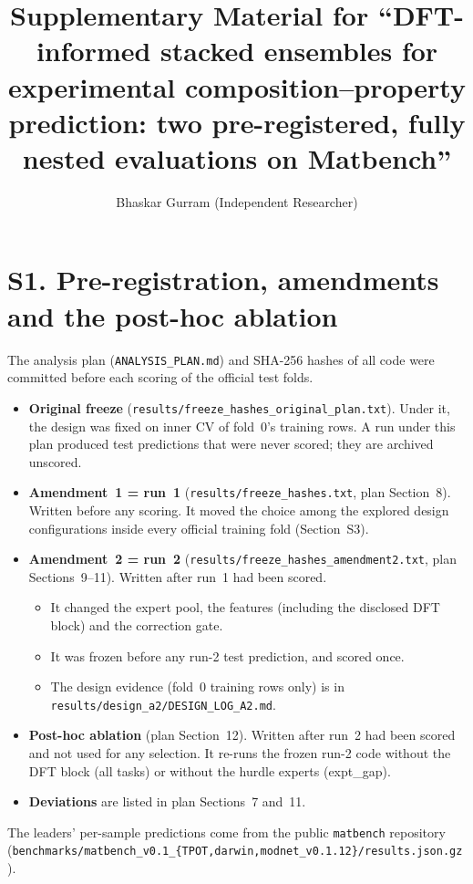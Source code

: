 \documentclass[11pt]{article}
\title{Supplementary Material for ``DFT-informed stacked ensembles for experimental composition--property prediction: two pre-registered, fully nested evaluations on Matbench''}
\author{Bhaskar Gurram (Independent Researcher)}
\date{}
\begin{document}
\maketitle
\tableofcontents

\section*{S1. Pre-registration, amendments and the post-hoc ablation}
The analysis plan (\texttt{ANALYSIS\_PLAN.md}) and SHA-256 hashes of all code were committed before each scoring of the official test folds.
\begin{itemize}
\item \textbf{Original freeze} (\texttt{results/freeze\_hashes\_original\_plan.txt}). Under it, the design was fixed on inner CV of fold~0's training rows. A run under this plan produced test predictions that were never scored; they are archived unscored.
\item \textbf{Amendment~1 = run~1} (\texttt{results/freeze\_hashes.txt}, plan Section~8). Written before any scoring. It moved the choice among the explored design configurations inside every official training fold (Section~S3).
\item \textbf{Amendment~2 = run~2} (\texttt{results/freeze\_hashes\_amendment2.txt}, plan Sections~9--11). Written after run~1 had been scored.
  \begin{itemize}
  \item It changed the expert pool, the features (including the disclosed DFT block) and the correction gate.
  \item It was frozen before any run-2 test prediction, and scored once.
  \item The design evidence (fold~0 training rows only) is in \texttt{results/design\_a2/DESIGN\_LOG\_A2.md}.
  \end{itemize}
\item \textbf{Post-hoc ablation} (plan Section~12). Written after run~2 had been scored and not used for any selection. It re-runs the frozen run-2 code without the DFT block (all tasks) or without the hurdle experts (expt\_gap).
\item \textbf{Deviations} are listed in plan Sections~7 and~11.
\end{itemize}
The leaders' per-sample predictions come from the public \texttt{matbench} repository (\texttt{benchmarks/matbench\_v0.1\_\{TPOT,darwin,modnet\_v0.1.12\}/results.json.gz}).
\end{document}
